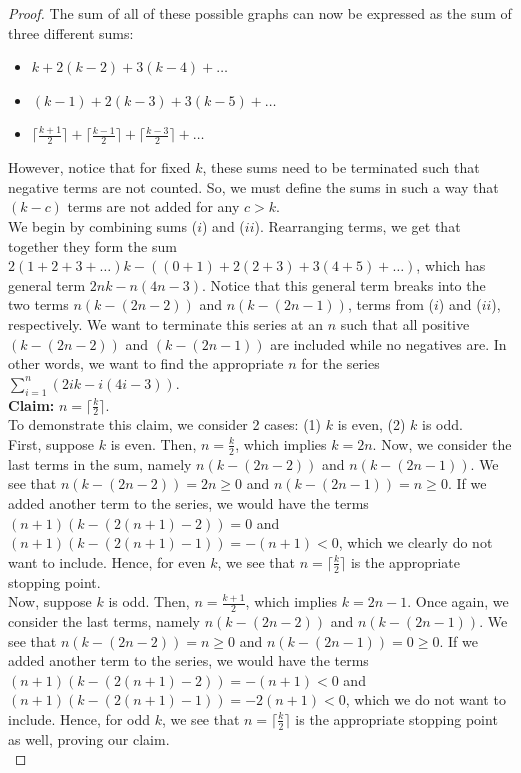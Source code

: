 \documentclass[12pt]{amsart}
\theoremstyle{plain} \numberwithin{equation}{section}
\theoremstyle{definition}
\theoremstyle{definition}
\begin{document}
\begin{proof}
    The sum of all of these possible graphs can now be expressed as the sum of three different sums:
    \begin{itemize}
        \item [($i$)] $k + 2(k-2) + 3(k-4) + \dots $
        \item [($ii$)] $(k-1) + 2(k-3) + 3(k-5) + \dots $
        \item [($iii$)] $\lceil\frac{k+1}{2}\rceil + \lceil\frac{k-1}{2}\rceil + \lceil\frac{k-3}{2}\rceil + \dots $
    \end{itemize}
    However, notice that for fixed $k$, these sums need to be terminated such that negative terms are not counted. So, we must define the sums in such a way that $(k-c)$ terms are not added for any $c>k$. \\
    We begin by combining sums ($i$) and ($ii$). Rearranging terms, we get that together they form the sum $2(1+2+3+\dots )k - ((0+1) + 2(2+3) + 3(4+5) + \dots )$, which has general term $2nk - n(4n-3)$. Notice that this general term breaks into the two terms $n(k - (2n-2))$ and $n(k-(2n-1))$, terms from ($i$) and ($ii$), respectively. We want to terminate this series at an $n$ such that all positive $(k-(2n-2))$ and $(k-(2n-1))$ are included while no negatives are. In other words, we want to find the appropriate $n$ for the series $\sum_{i=1}^n (2ik - i(4i-3))$. \\
    
    \textbf{Claim:} $n = \lceil\frac{k}{2}\rceil$. \\

    To demonstrate this claim, we consider 2 cases: (1) $k$ is even, (2) $k$ is odd. \\
    First, suppose $k$ is even. Then, $n = \frac{k}{2}$, which implies $k = 2n$. Now, we consider the last terms in the sum, namely $n(k-(2n-2))$ and $n(k-(2n-1))$. We see that $n(k-(2n-2)) = 2n\geq 0$ and $n(k-(2n-1)) = n\geq 0$. If we added another term to the series, we would have the terms $(n+1)(k-(2(n+1)-2)) = 0$ and $(n+1)(k-(2(n+1)-1)) = -(n+1) < 0$, which we clearly do not want to include. Hence, for even $k$, we see that $n = \lceil\frac{k}{2}\rceil$ is the appropriate stopping point. \\
    Now, suppose $k$ is odd. Then, $n = \frac{k+1}{2}$, which implies $k = 2n-1$. Once again, we consider the last terms, namely $n(k-(2n-2))$ and $n(k-(2n-1))$. We see that $n(k-(2n-2)) = n\geq 0$ and $n(k-(2n-1)) = 0\geq 0$. If we added another term to the series, we would have the terms $(n+1)(k-(2(n+1)-2)) = -(n+1) < 0$ and $(n+1)(k-(2(n+1)-1)) = -2(n+1) < 0$, which we do not want to include. Hence, for odd $k$, we see that $n = \lceil\frac{k}{2}\rceil$ is the appropriate stopping point as well, proving our claim. \\


\end{proof}
\end{document}
